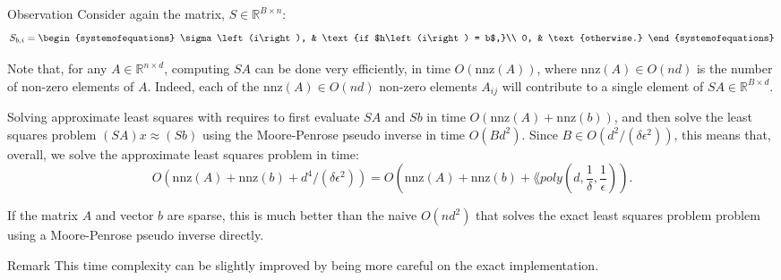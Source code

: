 \documentclass[a4paper]{article}
\begin{document}
\begin{parag}{Observation}
    Consider again the  matrix, $S \in \mathbb{R}^{B \times n}$:
    \[S_{b, i} = \begin{systemofequations} \sigma\left(i\right), & \text{if $h\left(i\right) = b$,}\\ 0, & \text{otherwise.} \end{systemofequations}\]

    Note that, for any $A \in \mathbb{R}^{n \times d}$, computing $S A$ can be done very efficiently, in time $O\left(\text{nnz}\left(A\right)\right)$, where $\text{nnz}\left(A\right) \in O\left(nd\right)$ is the number of non-zero elements of $A$. Indeed, each of the $\text{nnz}\left(A\right) \in O\left(nd\right)$ non-zero elements $A_{ij}$ will contribute to a single element of $S A \in \mathbb{R}^{B \times d}$.

    Solving approximate least squares with  requires to first evaluate $SA$ and $S b$ in time $O\left(\text{nnz}\left(A\right) + \text{nnz}\left(b\right)\right)$, and then solve the least squares problem $\left(SA\right)x \approx \left(S b\right)$ using the Moore-Penrose pseudo inverse in time $O\left(B d^2\right)$. Since $B \in O\left(d^2 / \left(\delta \epsilon^2\right)\right)$, this means that, overall, we solve the approximate least squares problem in time:
    \[O\left(\text{nnz}\left(A\right) + \text{nnz}\left(b\right) + d^4 / \left(\delta \epsilon^2\right)\right) = O\left(\text{nnz}\left(A\right) + \text{nnz}\left(b\right) + \lang{poly}\left(d, \frac{1}{\delta}, \frac{1}{\epsilon}\right)\right).\]

    If the matrix $A$ and vector $b$ are sparse, this is much better than the naive $O\left(n d^2\right)$ that solves the exact least squares problem problem using a Moore-Penrose pseudo inverse directly.

    \begin{subparag}{Remark}
        This time complexity can be slightly improved by being more careful on the exact implementation. 
    \end{subparag}
\end{parag}
\end{document}
